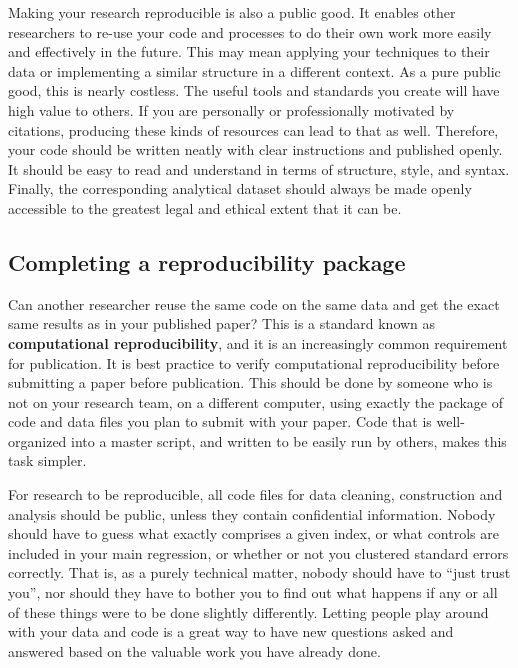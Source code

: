 Making your research reproducible is also a public good.
It enables other researchers to re-use your code and processes
to do their own work more easily and effectively in the future.
This may mean applying your techniques to their data
or implementing a similar structure in a different context.
As a pure public good, this is nearly costless.
The useful tools and standards you create will have high value to others.
If you are personally or professionally motivated by citations,
producing these kinds of resources can lead to that as well.
Therefore, your code should be written neatly with clear instructions and published openly.
It should be easy to read and understand in terms of structure, style, and syntax.
Finally, the corresponding analytical dataset should always be made openly accessible
to the greatest legal and ethical extent that it can be.

\subsection{Completing a reproducibility package}
Can another researcher reuse the same code on the same data
and get the exact same results as in your published paper?
This is a standard known as \textbf{computational reproducibility},
and it is an increasingly common requirement for publication.
It is best practice to verify computational reproducibility before submitting a paper before publication.
This should be done by someone who is not on your research team, on a different computer,
using exactly the package of code and data files you plan to submit with your paper.
Code that is well-organized into a master script, and written to be easily run by others,
makes this task simpler.

For research to be reproducible,
all code files for data cleaning, construction and analysis
should be public, unless they contain confidential information.
Nobody should have to guess what exactly comprises a given index,
or what controls are included in your main regression,
or whether or not you clustered standard errors correctly.
That is, as a purely technical matter, nobody should have to ``just trust you'',
nor should they have to bother you to find out what happens
if any or all of these things were to be done slightly differently.\cite{simmons2011false,simonsohn2015specification,wicherts2016degrees}
Letting people play around with your data and code
is a great way to have new questions asked and answered
based on the valuable work you have already done.


